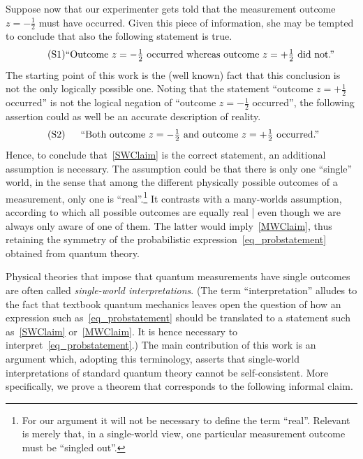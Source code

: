 \documentclass[12pt]{article}
\theoremstyle{plain}
\theoremstyle{definition}
\newcommand*{\sminus}{{\textstyle - \frac{1}{2}}}
\newcommand*{\splus}{{\textstyle + \frac{1}{2}}}
\newcommand*{\mclaim}[1]{\begin{minipage}{0.8\textwidth} \begin{center}  #1 \end{center}\end{minipage}}
\begin{document}
Suppose now that our experimenter gets told that the measurement outcome~$z = \sminus$ must have occurred. Given this piece of information, she may be tempted to conclude that also the following statement is true. 
\begin{align}
 \label{SWClaim} \tag{S1} \mclaim{``Outcome~$z = \sminus$ occurred whereas outcome~$z = \splus$ did not.''}
\end{align}
The starting point of this work is the (well known) fact that this conclusion is not the only logically possible one. Noting that the statement ``outcome $z = \splus$ occurred'' is not the logical negation of ``outcome $z = \sminus$ occurred'', the following assertion could as well be an accurate description of reality.
  \begin{align}
 \label{MWClaim} \tag{S2} \mclaim{``Both outcome~$z = \sminus$ and outcome~$z = \splus$ occurred.''} 
\end{align}
Hence, to conclude that~\eqref{SWClaim} is the correct statement, an additional assumption is necessary. The assumption could be that there is only one ``single'' world, in the sense that among the different physically possible outcomes of a measurement, only one is ``real''.\footnote{For our argument it will not be necessary to define the term ``real''.  Relevant is merely that, in a single-world view, one particular measurement outcome must be ``singled out''.}  It contrasts with a many-worlds assumption, according to which all possible outcomes are equally real | even though we are always only aware of one of them.  The latter would imply~\eqref{MWClaim}, thus retaining the symmetry of the probabilistic expression~\eqref{eq_probstatement} obtained from quantum theory.

Physical theories that impose that quantum measurements have single outcomes are often called \emph{single-world interpretations}. (The term ``interpretation'' alludes to the fact that textbook quantum mechanics leaves open the question of how an expression such as~\eqref{eq_probstatement} should be translated to a statement such as~\eqref{SWClaim} or~\eqref{MWClaim}. It is hence necessary to interpret~\eqref{eq_probstatement}.)  The main contribution of this work is an argument which, adopting this terminology, asserts that single-world interpretations of standard quantum theory cannot be self-consistent.  More specifically, we prove a theorem that corresponds to the following informal claim. 
\end{document}
